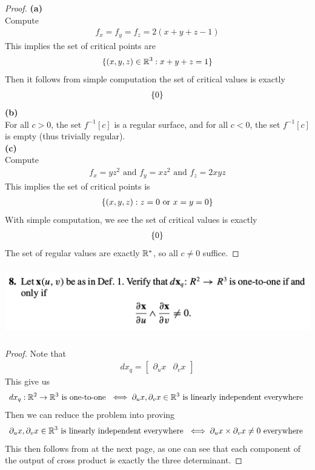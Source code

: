 \documentclass{report}
\begin{document}
\begin{proof}
\textbf{(a)}\\

Compute 
\begin{align*}
f_x=f_y=f_z=2(x+y+z-1)
\end{align*}
This implies the set of critical points are 
\begin{align*}
\{ (x,y,z)\in\mathbb{R}^3:x+y+z=1 \}
\end{align*}
Then it follows from simple computation the set of  critical values is exactly 
\begin{align*}
\{ 0 \}
\end{align*}
\textbf{(b)}\\

For all $c>0$,  the set $f^{-1}[c]$ is a regular surface, and for all $c<0$, the set  $f^{-1}[c]$ is empty (thus trivially regular).\\

\textbf{(c)}\\

Compute 
\begin{align*}
f_x=yz^2\text{ and }f_y=xz^2\text{ and }f_z=2xyz
\end{align*}
This implies the set of critical points is 
\begin{align*}
\{ (x,y,z):z=0\text{ or }x=y=0 \}
\end{align*}
With simple computation, we see the set of  critical values is exactly 
\begin{align*}
\{ 0 \}
\end{align*}
The set of regular values are exactly $\mathbb{R}^*$, so all  $c\neq 0$ suffice.
\end{proof}
\begin{question}{}{}
\includegraphics[height=3cm,width=18cm]{Ghw2b}
\end{question}
\begin{proof}
Note that 
\begin{align*}
dx_q=\begin{bmatrix}
  \partial_u x & \partial_v x
\end{bmatrix}
\end{align*} 
This give us 
\begin{align*}
dx_q:\mathbb{R}^2 \rightarrow \mathbb{R}^3\text{ is one-to-one }\iff \partial_ux, \partial_vx \in\mathbb{R}^3 \text{ is linearly independent everywhere }
\end{align*}
Then we can reduce the problem into proving 
\begin{align*}
\partial _u x, \partial_v x\in\mathbb{R}^3 \text{ is linearly independent everywhere }\iff \partial_ux\times\partial_v x\neq 0\text{ everywhere }
\end{align*}
This then follows from  at the next page, as one can see that each component of the output of cross product is exactly the three determinant. 
\end{proof}
\end{document}
